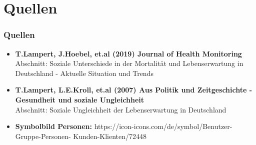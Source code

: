 \documentclass{beamer}
\begin{document}
\section{Quellen}
\begin{frame}
\frametitle{Quellen}
  \begin{itemize}
    \item \textbf{T.Lampert, J.Hoebel, et.al (2019) Journal of Health Monitoring}\\
    Abschnitt: Soziale Unterschiede in der Mortalität und Lebenserwartung in Deutschland - Aktuelle Situation und Trends
    
    \item \textbf{T.Lampert, L.E.Kroll, et.al (2007) Aus Politik       und Zeitgeschichte - Gesundheit und soziale Ungleichheit}\\
Abschnitt: Soziale Ungleichheit der Lebenserwartung in Deutschland

    \item \textbf{Symbolbild Personen:}
    https://icon-icons.com/de/symbol/Benutzer-Gruppe-Personen-   Kunden-Klienten/72448
    
    
  \end{itemize}

\end{frame}
\end{document}
